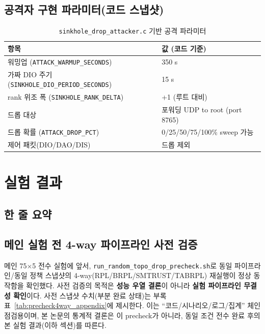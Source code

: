 \documentclass[12pt,a4paper]{article}
\begin{document}
\subsection{공격자 구현 파라미터(코드 스냅샷)}
\label{app:attack_impl}

\begin{table}[htbp]
\centering
\caption{\texttt{sinkhole\_drop\_attacker.c} 기반 공격 파라미터}
\label{tab:attack_impl}
\begin{tabular}{ll}
\toprule
항목 & 값 (코드 기준) \\
\midrule
워밍업 (\texttt{ATTACK\_WARMUP\_SECONDS}) & 350 s \\
가짜 DIO 주기 (\texttt{SINKHOLE\_DIO\_PERIOD\_SECONDS}) & 15 s \\
rank 위조 폭 (\texttt{SINKHOLE\_RANK\_DELTA}) & +1 (루트 대비) \\
드롭 대상 & 포워딩 UDP to root (port 8765) \\
드롭 확률 (\texttt{ATTACK\_DROP\_PCT}) & 0/25/50/75/100\% sweep 가능 \\
제어 패킷(DIO/DAO/DIS) & 드롭 제외 \\
\bottomrule
\end{tabular}
\end{table}


\section{실험 결과}
\label{sec:results}

\subsection{한 줄 요약}

\begin{center}
\end{center}

\subsection{메인 실험 전 4-way 파이프라인 사전 검증}
\label{sec:precheck4way}

메인 75$\times$5 전수 실험에 앞서,
\texttt{run\_random\_topo\_drop\_precheck.sh}로
동일 파이프라인/동일 정책 스냅샷의 4-way(RPL/BRPL/SMTRUST/TABRPL)
재실행이 정상 동작함을 확인했다.
사전 검증의 목적은 \textbf{성능 우열 결론}이 아니라
\textbf{실험 파이프라인 무결성 확인}이다.
사전 스냅샷 수치(부분 완료 상태)는 부록 표~\ref{tab:precheck4way_appendix}에 제시한다.
이는 ``코드/시나리오/로그/집계'' 체인 점검용이며,
본 논문의 통계적 결론은 이 precheck가 아니라,
동일 조건 전수 완료 후의 본 실험 결과(이하 섹션)를 따른다.
\end{document}
